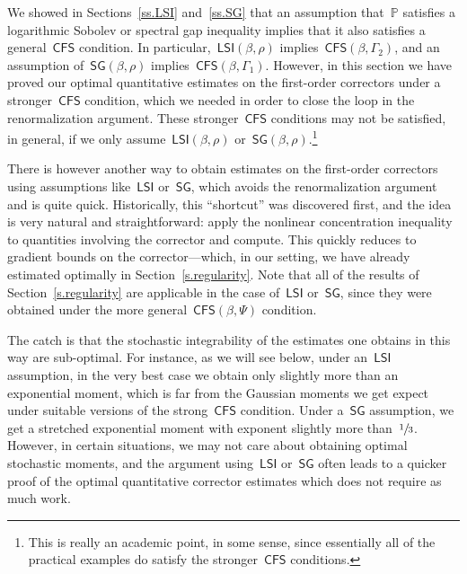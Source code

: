 \documentclass[11pt]{article} %
\numberwithin{equation}{section}
\theoremstyle{definition}
\renewcommand{\P}{\mathbb{P}}
\newcommand{\CFS}{\mathsf{CFS}}
\newcommand{\LSI}{\mathsf{LSI}}
\newcommand{\SG}{\mathsf{SG}}
\begin{document}
We showed in Sections~\ref{ss.LSI} and~\ref{ss.SG} that an assumption that~$\P$ satisfies a logarithmic Sobolev or spectral gap inequality implies that it also satisfies a general~$\CFS$ condition. 
In particular,~$\LSI(\beta,\rho)$ implies~$\CFS(\beta,\Gamma_2)$, and an assumption of~$\SG(\beta,\rho)$ implies~$\CFS(\beta,\Gamma_1)$.
However, in this section we have proved our optimal quantitative estimates on the first-order correctors under a stronger~$\CFS$ condition, which we needed in order to close the loop in the renormalization argument. These stronger~$\CFS$ conditions may not be satisfied, in general, if we only assume~$\LSI(\beta,\rho)$ or~$\SG(\beta,\rho)$.\footnote{This is really an academic point, in some sense, since essentially all of the practical examples do satisfy the stronger~$\CFS$ conditions.}

\smallskip

There is however another way to obtain estimates on the first-order correctors using assumptions like~$\LSI$ or~$\SG$, which avoids the renormalization argument and is quite quick. Historically, this ``shortcut'' was discovered first, and the idea is very natural and straightforward: apply the nonlinear concentration inequality to quantities involving the corrector and compute. This quickly reduces to gradient bounds on the corrector---which, in our setting, we have already estimated optimally in Section~\ref{s.regularity}. Note that all of the results of Section~\ref{s.regularity} are applicable in the case of~$\LSI$ or~$\SG$, since they were obtained under the more general~$\CFS(\beta,\Psi)$ condition. 

\smallskip

The catch is that the stochastic integrability of the estimates one obtains in this way are sub-optimal. For instance, as we will see below, under an~$\LSI$ assumption, in the very best case we obtain only slightly more than an exponential moment, which is far from the Gaussian moments we get expect under suitable versions of the strong~$\CFS$ condition. Under a~$\SG$ assumption, we get a stretched exponential moment with exponent slightly more than~$\sfrac13$. 
However, in certain situations, we may not care about obtaining optimal stochastic moments, and the argument using~$\LSI$ or~$\SG$ often leads to a quicker proof of the optimal quantitative corrector estimates which does not require as much work. 

\smallskip
\end{document}
